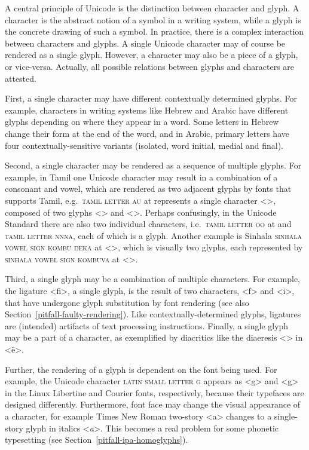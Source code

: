 A central principle of Unicode is the distinction between character and glyph. A
character is the abstract notion of a symbol in a writing system, while a glyph
is the concrete drawing of such a symbol. In practice, there is a complex
interaction between characters and glyphs. A single Unicode character may of
course be rendered as a single glyph. However, a character may also be a piece
of a glyph, or vice-versa. Actually, all possible relations between glyphs and
characters are attested.

First, a single character may have different contextually determined glyphs. For
example, characters in writing systems like Hebrew and Arabic have different
glyphs depending on where they appear in a word. Some letters in Hebrew change
their form at the end of the word, and in Arabic, primary letters have four
contextually-sensitive variants (isolated, word initial, medial and final).

Second, a single character may be rendered as a sequence of multiple glyphs. For
example, in Tamil one Unicode character may result in a combination of a
consonant and vowel, which are rendered as two adjacent glyphs by fonts that
supports Tamil, e.g.\ \textsc{tamil letter au} at  represents a single 
character <>, composed of two glyphs <> and <>. Perhaps confusingly, 
in the Unicode Standard there are also two individual characters, 
i.e.\ \textsc{tamil letter oo} at  and 
 \textsc{tamil letter nnna}, each of which is a glyph. Another example is 
Sinhala \textsc{sinhala vowel sign kombu deka} at  <>, which is 
visually two glyphs, each represented by \textsc{sinhala vowel sign kombuva} 
at  <>.

Third, a single glyph may be a combination of multiple characters. For example, 
the ligature <ﬁ>, a single glyph, is the result of two
characters, <f> and <i>, that have undergone glyph substitution by font
rendering (see also Section~\ref{pitfall-faulty-rendering}). Like
contextually-determined glyphs, ligatures are (intended) artifacts of text
processing instructions. Finally, a single glyph may be a part of a
character, as exemplified by diacritics like the diaeresis <> in <ë>.

Further, the rendering of a glyph is dependent on the font being used. For
example, the Unicode character \textsc{latin small letter g} appears as <g> and
<{g}> in the Linux Libertine and Courier fonts, respectively,
because their typefaces are designed differently. Furthermore, font face may
change the visual appearance of a character, for example Times New Roman
two-story <{a}> changes to a single-story glyph in italics
<\emph{a}>. This becomes a real problem for some
phonetic typesetting (see Section~\ref{pitfall-ipa-homoglyphs}).

